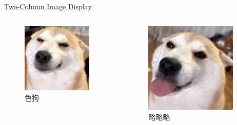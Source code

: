 \documentclass[11pt,aspectratio=43,xcolor={dvipsnames},hyperref={pdftex,pdfpagemode=UseNone,hidelinks,pdfdisplaydoctitle=true},usepdftitle=false]{ctexbeamer}
\begin{document}
\begin{frame}{\underline{Two-Column Image Display}}
  \begin{columns}
    \begin{column}{0.48\textwidth}
      \begin{figure}
        \centering
        \includegraphics[width=0.9\textwidth]{sources/fig1.jpg}
        \caption{色狗}
      \end{figure}
    \end{column}
    
    \hfill
    
    \begin{column}{0.48\textwidth}
      \begin{figure}
        \centering
        \includegraphics[width=0.9\textwidth]{sources/fig2.jpg}
        \caption{略略略}
      \end{figure}
    \end{column}
  \end{columns}
  

\end{frame}
\end{document}
